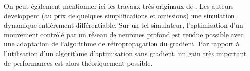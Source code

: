 On peut également mentionner ici les travaux très originaux 
de \cite{degrave_differentiable_nodate}.
Les auteurs développent (au prix de quelques simplifications et omissions) 
une simulation dynamique entièrement différentiable.
Sur un tel simulateur, l'optimisation d'un mouvement contrôlé par un réseau 
de neurones profond est rendue possible avec une adaptation de l'algorithme de 
rétropropagation du gradient.
Par rapport à l'utilisation d'un algorithme d'optimisation sans gradient, 
un gain très important de performances est alors théoriquement possible.\\

